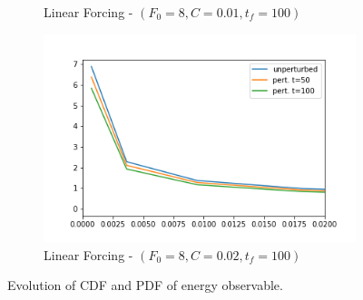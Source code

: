 \documentclass{article}
\begin{document}
\begin{figure}[!ht]
\begin{subfigure}[b]{0.48\textwidth}
		\caption{Linear Forcing - $(F_0=8, C=0.01, t_f=100)$}
		\label{fig:pred_pdf_zoom_energy_bin_00q_10q_LF_8_001_0_100}
	\end{subfigure}%
	\begin{subfigure}[b]{0.48\textwidth}
		\includegraphics[width=1\linewidth]{fig/pred_pdf_zoom_energy_below_L_002_100.png}
		\caption{Linear Forcing - $(F_0=8, C=0.02, t_f=100)$}
		\label{fig:pred_pdf_zoom_energy_bin_00q_10q_LF_8_002_0_100}
	\end{subfigure}
	\caption{Evolution of CDF and PDF of energy observable.}
	\label{fig:pred_energy_cdf_pdf}
\end{figure}
\end{document}
